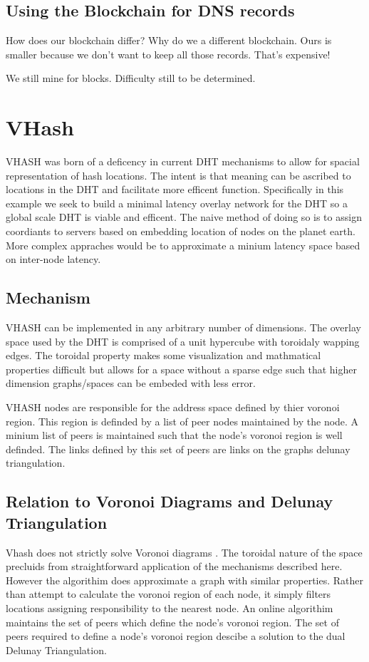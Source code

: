 \documentclass[11pt]{IEEEtran} %
\begin{document}
\subsection{Using the Blockchain for DNS records}
How does our blockchain differ?  Why do we a different blockchain.  Ours is smaller because we don't want to keep all those records. That's expensive! 

We still mine for blocks.  Difficulty still to be determined.


\section{VHash}
VHASH was born of a deficency in current DHT mechanisms to allow for spacial representation of hash locations. The intent is that meaning can be ascribed to locations in the DHT and facilitate more efficent function. Specifically in this example we seek to build a minimal latency overlay network for the DHT so a global scale DHT is viable and efficent. The naive method of doing so is to assign coordiants to servers based on embedding location of nodes on the planet earth. More complex appraches would be to approximate a minium latency space based on inter-node latency.


\subsection{Mechanism}
VHASH can be implemented in any arbitrary number of dimensions. The overlay space used by the DHT is comprised of a unit hypercube with toroidaly wapping edges. The toroidal property makes some visualization and mathmatical properties difficult but allows for a space without a sparse edge such that higher dimension graphs/spaces can be embeded with less error.

VHASH nodes are responsible for the address space defined by thier voronoi region. This region is definded by a list of peer nodes maintained by the node. A minium list of peers is maintained such that the node's voronoi region is well definded. The links defined by this set of peers are links on the graphs delunay triangulation. 

\subsection{Relation to Voronoi Diagrams and Delunay Triangulation}

Vhash does not strictly solve Voronoi diagrams \cite{voronoi}. The toroidal nature of the space precluids from straightforward application of the mechanisms described here\cite{voronoi}. However the algorithim does approximate a graph with similar properties. Rather than attempt to calculate the voronoi region of each node, it simply filters locations assigning responsibility to the nearest node. An online algorithim maintains the set of peers which define the node's voronoi region. The set of peers required to define a node's voronoi region descibe a solution to the dual Delunay Triangulation.
\end{document}

